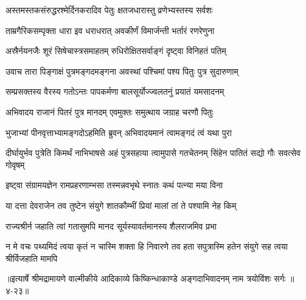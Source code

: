 \twolineshloka
{अस्तमस्तकसंरुद्धरश्मेर्दिनकरादिव}
{पेतुः क्षतजधारास्तु व्रणेभ्यस्तस्य सर्वशः} %

\twolineshloka
{ताम्रगैरिकसम्पृक्ता धारा इव धराधरात्}
{अवकीर्णं विमार्जन्ती भर्तारं रणरेणुना} %

\twolineshloka
{अस्रैर्नयनजैः शूरं सिषेचास्त्रसमाहतम्}
{रुधिरोक्षितसर्वाङ्गं दृष्ट्वा विनिहतं पतिम्} %

\twolineshloka
{उवाच तारा पिङ्गाक्षं पुत्रमङ्गदमङ्गना}
{अवस्थां पश्चिमां पश्य पितुः पुत्र सुदारुणाम्} %

\twolineshloka
{सम्प्रसक्तस्य वैरस्य गतोऽन्तः पापकर्मणा}
{बालसूर्योज्ज्वलतनुं प्रयातं यमसादनम्} %

\twolineshloka
{अभिवादय राजानं पितरं पुत्र मानदम्}
{एवमुक्तः समुत्थाय जग्राह चरणौ पितुः} %

\twolineshloka
{भुजाभ्यां पीनवृत्ताभ्यामङ्गदोऽहमिति ब्रुवन्}
{अभिवादयमानं त्वामङ्गदं त्वं यथा पुरा} %

\threelineshloka
{दीर्घायुर्भव पुत्रेति किमर्थं नाभिभाषसे}
{अहं पुत्रसहाया त्वामुपासे गतचेतनम्}
{सिंहेन पातितं सद्यो गौः सवत्सेव गोवृषम्} %

\twolineshloka
{इष्ट्वा संग्रामयज्ञेन रामप्रहरणाम्भसा}
{तस्मन्नवभृथे स्नातः कथं पत्न्या मया विना} %

\twolineshloka
{या दत्ता देवराजेन तव तुष्टेन संयुगे}
{शातकौम्भीं प्रियां मालां तां ते पश्यामि नेह किम्} %

\twolineshloka
{राज्यश्रीर्न जहाति त्वां गतासुमपि मानद}
{सूर्यस्यावर्तमानस्य शैलराजमिव प्रभा} %

\twolineshloka
{न मे वचः पथ्यमिदं त्वया कृतं न चास्मि शक्ता हि निवारणे तव}
{हता सपुत्रास्मि हतेन संयुगे सह त्वया श्रीर्विजहाति मामपि} %


॥इत्यार्षे श्रीमद्रामायणे वाल्मीकीये आदिकाव्ये किष्किन्धाकाण्डे अङ्गदाभिवादनम् नाम त्रयोविंशः सर्गः ॥४-२३॥
